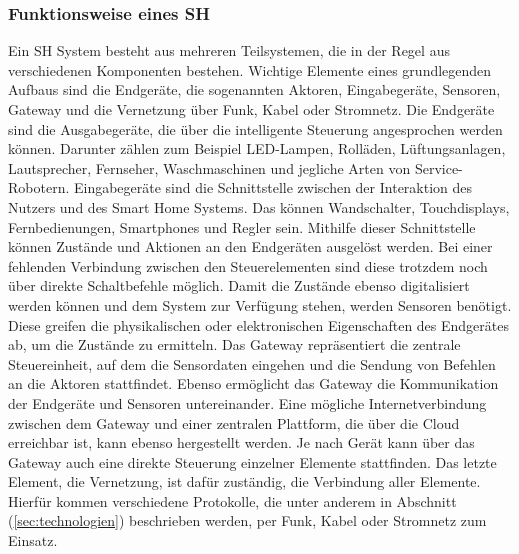     \subsubsection*{Funktionsweise eines \acl{SH}}
    \label{subsubsec:funktionsweise}
        Ein \acl{SH} System besteht aus mehreren Teilsystemen, die in der Regel aus verschiedenen Komponenten bestehen. 
        Wichtige Elemente eines grundlegenden Aufbaus sind die Endgeräte, die sogenannten Aktoren, Eingabegeräte, 
        Sensoren, Gateway und die Vernetzung über Funk, Kabel oder Stromnetz. Die Endgeräte sind die Ausgabegeräte, die 
        über die intelligente Steuerung angesprochen werden können. Darunter zählen zum Beispiel 
        LED-Lampen, Rolläden, Lüftungsanlagen, Lautsprecher, Fernseher, Waschmaschinen und jegliche Arten von 
        Service-Robotern. Eingabegeräte sind die Schnittstelle zwischen der Interaktion des Nutzers und des 
        Smart Home Systems. Das können Wandschalter, Touchdisplays, Fernbedienungen, Smartphones und Regler sein. 
        Mithilfe dieser Schnittstelle können Zustände und Aktionen an den Endgeräten ausgelöst werden. Bei einer 
        fehlenden Verbindung zwischen den Steuerelementen sind diese trotzdem noch über direkte Schaltbefehle möglich. 
        Damit die Zustände ebenso digitalisiert werden können und dem System zur Verfügung stehen, werden Sensoren 
        benötigt. Diese greifen die physikalischen oder elektronischen Eigenschaften des Endgerätes ab, um die 
        Zustände zu ermitteln. Das Gateway repräsentiert die zentrale Steuereinheit, auf dem die Sensordaten 
        eingehen und die Sendung von Befehlen an die Aktoren stattfindet. Ebenso ermöglicht das Gateway die 
        Kommunikation der Endgeräte und Sensoren untereinander. Eine mögliche Internetverbindung zwischen 
        dem Gateway und einer zentralen Plattform, die über die Cloud erreichbar ist, kann ebenso hergestellt werden. 
        Je nach Gerät kann über das Gateway auch eine direkte Steuerung einzelner Elemente stattfinden. Das letzte 
        Element, die Vernetzung, ist dafür zuständig, die Verbindung aller Elemente. Hierfür kommen verschiedene 
        Protokolle, die unter anderem in Abschnitt (\ref{sec:technologien}) beschrieben werden, 
        per Funk, Kabel oder Stromnetz zum Einsatz. %
        \\
